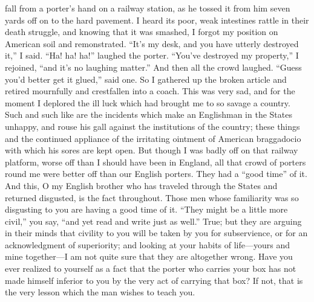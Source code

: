 fall from a porter's hand on a railway station, as he tossed it
from him seven yards off on to the hard pavement.  I heard its
poor, weak intestines rattle in their death struggle, and knowing
that it was smashed, I forgot my position on American soil and
remonstrated.  ``It's my desk, and you have utterly destroyed it,'' I
said.  ``Ha! ha! ha!'' laughed the porter.  ``You've destroyed my
property,'' I rejoined, ``and it's no laughing matter.''  And then all
the crowd laughed.  ``Guess you'd better get it glued,'' said one.
So I gathered up the broken article and retired mournfully and
crestfallen into a coach.  This was very sad, and for the moment I
deplored the ill luck which had brought me to so savage a country.
Such and such like are the incidents which make an Englishman in
the States unhappy, and rouse his gall against the institutions of
the country; these things and the continued appliance of the
irritating ointment of American braggadocio with which his sores
are kept open.  But though I was badly off on that railway
platform, worse off than I should have been in England, all that
crowd of porters round me were better off than our English porters.
They had a ``good time'' of it.  And this, O my English brother who
has traveled through the States and returned disgusted, is the fact
throughout.  Those men whose familiarity was so disgusting to you
are having a good time of it.  ``They might be a little more civil,''
you say, ``and yet read and write just as well.''  True; but they are
arguing in their minds that civility to you will be taken by you
for subservience, or for an acknowledgment of superiority; and
looking at your habits of life---yours and mine together---I am not
quite sure that they are altogether wrong.  Have you ever realized
to yourself as a fact that the porter who carries your box has not
made himself inferior to you by the very act of carrying that box?
If not, that is the very lesson which the man wishes to teach you.

